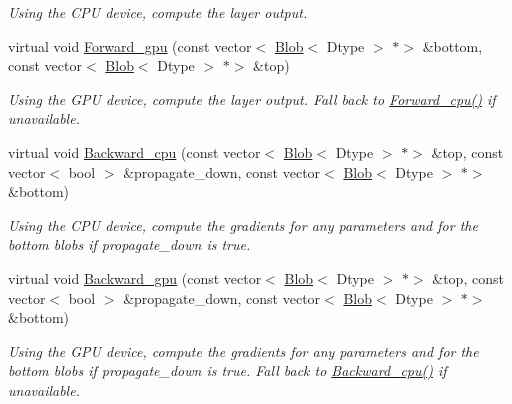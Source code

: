 \begin{DoxyCompactItemize}
\begin{DoxyCompactList}\small\item\em Using the C\+PU device, compute the layer output. \end{DoxyCompactList}\item 
\mbox{\label{classcaffe_1_1_bias_layer_aa767113391a272912043f77d5acccb3e}} 
virtual void \mbox{\hyperlink{classcaffe_1_1_bias_layer_aa767113391a272912043f77d5acccb3e}{Forward\+\_\+gpu}} (const vector$<$ \mbox{\hyperlink{classcaffe_1_1_blob}{Blob}}$<$ Dtype $>$ $\ast$$>$ \&bottom, const vector$<$ \mbox{\hyperlink{classcaffe_1_1_blob}{Blob}}$<$ Dtype $>$ $\ast$$>$ \&top)
\begin{DoxyCompactList}\small\item\em Using the G\+PU device, compute the layer output. Fall back to \mbox{\hyperlink{classcaffe_1_1_bias_layer_abbab2f856ed656aefc4fa7049c77d008}{Forward\+\_\+cpu()}} if unavailable. \end{DoxyCompactList}\item 
\mbox{\label{classcaffe_1_1_bias_layer_a267ebd90e57e537ade6786675b12ecd4}} 
virtual void \mbox{\hyperlink{classcaffe_1_1_bias_layer_a267ebd90e57e537ade6786675b12ecd4}{Backward\+\_\+cpu}} (const vector$<$ \mbox{\hyperlink{classcaffe_1_1_blob}{Blob}}$<$ Dtype $>$ $\ast$$>$ \&top, const vector$<$ bool $>$ \&propagate\+\_\+down, const vector$<$ \mbox{\hyperlink{classcaffe_1_1_blob}{Blob}}$<$ Dtype $>$ $\ast$$>$ \&bottom)
\begin{DoxyCompactList}\small\item\em Using the C\+PU device, compute the gradients for any parameters and for the bottom blobs if propagate\+\_\+down is true. \end{DoxyCompactList}\item 
\mbox{\label{classcaffe_1_1_bias_layer_a879d979171c8f79f7b5b07b4d9e7945d}} 
virtual void \mbox{\hyperlink{classcaffe_1_1_bias_layer_a879d979171c8f79f7b5b07b4d9e7945d}{Backward\+\_\+gpu}} (const vector$<$ \mbox{\hyperlink{classcaffe_1_1_blob}{Blob}}$<$ Dtype $>$ $\ast$$>$ \&top, const vector$<$ bool $>$ \&propagate\+\_\+down, const vector$<$ \mbox{\hyperlink{classcaffe_1_1_blob}{Blob}}$<$ Dtype $>$ $\ast$$>$ \&bottom)
\begin{DoxyCompactList}\small\item\em Using the G\+PU device, compute the gradients for any parameters and for the bottom blobs if propagate\+\_\+down is true. Fall back to \mbox{\hyperlink{classcaffe_1_1_bias_layer_a644c6ae32fde130475b8de04db36ea5b}{Backward\+\_\+cpu()}} if unavailable. \end{DoxyCompactList}\end{DoxyCompactItemize}
